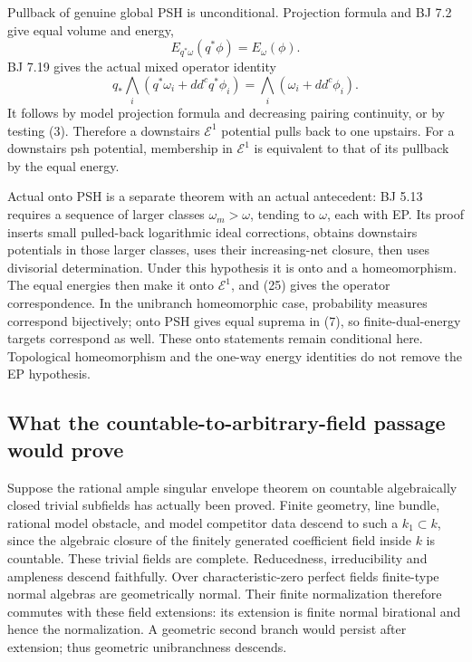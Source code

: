 \documentclass[
  11pt,
]{article}
\begin{document}
Pullback of genuine global PSH is unconditional. Projection formula and
BJ 7.2 give equal volume and energy,
\[E_{q^*\omega}(q^*\phi)=E_\omega(\phi).\] BJ 7.19 gives the actual
mixed operator identity \[q_*\bigwedge_i(q^*\omega_i+dd^cq^*\phi_i)
             =\bigwedge_i(\omega_i+dd^c\phi_i).                        \tag{25}\]
It follows by model projection formula and decreasing pairing
continuity, or by testing (3). Therefore a downstairs \(\mathcal E^1\)
potential pulls back to one upstairs. For a downstairs psh potential,
membership in \(\mathcal E^1\) is equivalent to that of its pullback by
the equal energy.

Actual onto PSH is a separate theorem with an actual antecedent: BJ 5.13
requires a sequence of larger classes \(\omega_m>\omega\), tending to
\(\omega\), each with EP. Its proof inserts small pulled-back
logarithmic ideal corrections, obtains downstairs potentials in those
larger classes, uses their increasing-net closure, then uses divisorial
determination. Under this hypothesis it is onto and a homeomorphism. The
equal energies then make it onto \(\mathcal E^1\), and (25) gives the
operator correspondence. In the unibranch homeomorphic case, probability
measures correspond bijectively; onto PSH gives equal suprema in (7), so
finite-dual-energy targets correspond as well. These onto statements
remain conditional here. Topological homeomorphism and the one-way
energy identities do not remove the EP hypothesis.

\subsection{What the countable-to-arbitrary-field passage would
prove}\label{what-the-countable-to-arbitrary-field-passage-would-prove}

Suppose the rational ample singular envelope theorem on countable
algebraically closed trivial subfields has actually been proved. Finite
geometry, line bundle, rational model obstacle, and model competitor
data descend to such a \(k_1\subset k\), since the algebraic closure of
the finitely generated coefficient field inside \(k\) is countable.
These trivial fields are complete. Reducedness, irreducibility and
ampleness descend faithfully. Over characteristic-zero perfect fields
finite-type normal algebras are geometrically normal. Their finite
normalization therefore commutes with these field extensions: its
extension is finite normal birational and hence the normalization. A
geometric second branch would persist after extension; thus geometric
unibranchness descends.
\end{document}
